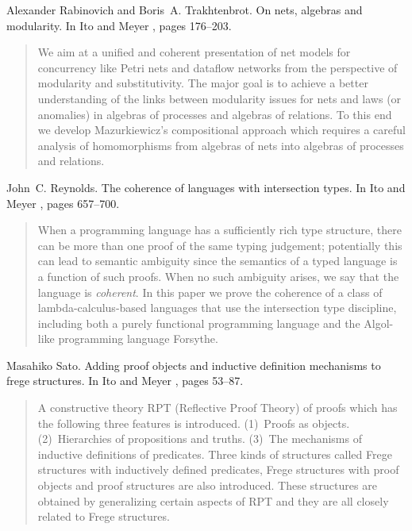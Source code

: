 \begin{thebibliography}{10}
Alexander Rabinovich and Boris~A. Trakhtenbrot.
\newblock On nets, algebras and modularity.
\newblock In Ito and Meyer \cite{TACS91}, pages 176--203.
\begin{quotation}
We aim at a unified and coherent presentation of net models for concurrency
  like Petri nets and dataflow networks from the perspective of modularity and
  substitutivity. The major goal is to achieve a better understanding of the
  links between modularity issues for nets and laws (or anomalies) in algebras
  of processes and algebras of relations. To this end we develop Mazurkiewicz's
  compositional approach which requires a careful analysis of homomorphisms
  from algebras of nets into algebras of processes and relations.
\end{quotation}

John~C. Reynolds.
\newblock The coherence of languages with intersection types.
\newblock In Ito and Meyer \cite{TACS91}, pages 657--700.
\begin{quotation}
When a programming language has a sufficiently rich type structure, there can
  be more than one proof of the same typing judgement; potentially this can
  lead to semantic ambiguity since the semantics of a typed language is a
  function of such proofs. When no such ambiguity arises, we say that the
  language is {\em coherent}. In this paper we prove the coherence of a class
  of lambda-calculus-based languages that use the intersection type discipline,
  including both a purely functional programming language and the Algol-like
  programming language Forsythe.
\end{quotation}

Masahiko Sato.
\newblock Adding proof objects and inductive definition mechanisms to frege
  structures.
\newblock In Ito and Meyer \cite{TACS91}, pages 53--87.
\begin{quotation}
A constructive theory RPT (Reflective Proof Theory) of proofs which has the
  following three features is introduced. (1)~Proofs as objects.
  (2)~Hierarchies of propositions and truths. (3)~The mechanisms of inductive
  definitions of predicates. Three kinds of structures called Frege structures
  with inductively defined predicates, Frege structures with proof objects and
  proof structures are also introduced. These structures are obtained by
  generalizing certain aspects of RPT and they are all closely related to Frege
  structures.
\end{quotation}


\end{thebibliography}
